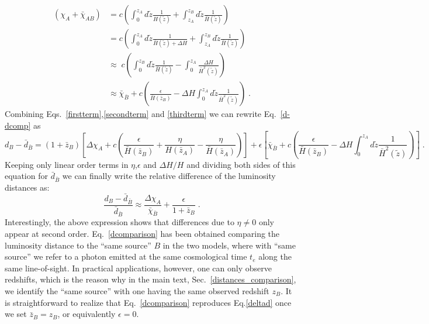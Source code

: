 \documentclass[notitlepage,nofootinbib]{revtex4-1}
\begin{document}
\begin{equation}\label{thirdterm}
\begin{split}
 \left(\chi_A + \bar{\chi}_{AB}\right) &= c\left(\int_0^{z_A}d\tilde{z} \frac{1}{H(\tilde{z})} + \int_{z_A}^{z_B}d\tilde{z} \frac{1}{\bar{H}(\tilde{z})} \right)\\
 &= c\left(\int_0^{z_A}d\tilde{z} \frac{1}{\bar{H}(\tilde{z}) + \Delta H} + \int_{z_A}^{z_B}d\tilde{z} \frac{1}{\bar{H}(\tilde{z})} \right)\\
 &\approx \; c\left(\int_0^{z_B}d\tilde{z} \frac{1}{\bar{H}(\tilde{z})} - \int_0^{z_A}\frac{\Delta H}{\bar{H}^2(\tilde{z})}\right)\\
 &\approx \bar{\chi}_{\bar{B}} + c\left(\frac{\epsilon}{\bar{H}(\bar{z}_B)} - \Delta H\int_0^{z_A}d\tilde{z} \frac{1}{\bar{H}^2(\tilde{z})}\right)\;.
\end{split}
\end{equation}
Combining Eqs.~\eqref{firstterm},\eqref{secondterm} and \eqref{thirdterm} we can rewrite Eq.~\eqref{d-dcomp} as
\begin{equation}
    d_B -\bar{d}_{\bar{B}} = \left(1+\bar{z}_B\right)\left[\Delta \chi_{A} +c\left(\frac{\epsilon}{\bar{H}(\bar{z}_B)} + \frac{\eta}{H(\bar{z}_A)} - \frac{\eta}{\bar{H}(\bar{z}_A)}\right) \right] + \epsilon\left[\bar{\chi}_{\bar{B}} + c\left(\frac{\epsilon}{\bar{H}(\bar{z}_B)} - \Delta H\int_0^{z_A}d\tilde{z} \frac{1}{\bar{H}^2(\tilde{z})} \right)\right]\;.
\end{equation}
Keeping only linear order terms in $\eta$,$\epsilon$ and $\Delta H/H$ and dividing both sides of this equation for $\bar{d}_{\bar{B}}$ we can finally write the relative difference of the luminosity distances as:
\begin{equation}\label{dcomparison}
   \frac{d_B -\bar{d}_{\bar{B}}}{\bar{d}_{\bar{B}}} \approx \frac{\Delta \chi_A}{\bar{\chi}_{\bar{B}} } + \frac{\epsilon}{1+\bar{z}_B}\;. 
\end{equation}
Interestingly, the above expression shows that differences due to $\eta\neq 0$ only appear at second order. Eq.~\eqref{dcomparison} has been obtained comparing the luminosity distance to the ``same source'' $B$ in the two models, where with ``same source'' we refer to a photon emitted at the same cosmological time $t_e$ along the same line-of-sight. In practical applications, however, one can only observe redshifts, which is the reason why in the main text, Sec.~\ref{distances_comparison}, we identify the ``same source'' with one having the same observed redshift $z_B$. It is straightforward to realize that Eq.~\eqref{dcomparison} reproduces Eq.\eqref{deltad} once we set $\bar{z}_B = z_B$, or equivalently $\epsilon=0$.
\end{document}
